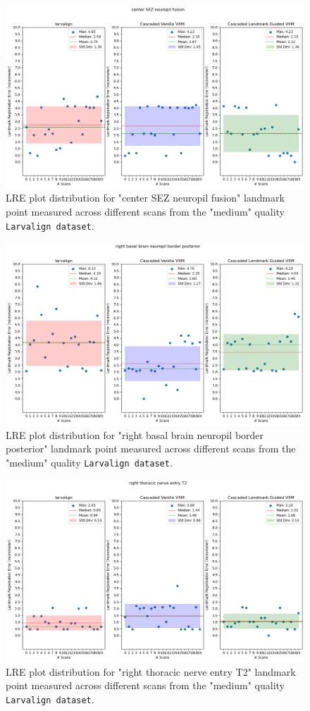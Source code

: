 	\begin{figure}[h]
		\centering
		\includegraphics[width=0.75\columnwidth]{resources/chapter5_fresh/output/center SEZ neuropil fusion.png}
		\caption{LRE plot distribution for "center SEZ neuropil fusion" landmark point measured across different scans from the "medium" quality \texttt{Larvalign dataset}.}
		\label{fig:landmark3}
	\end{figure}

	\begin{figure}[h]
		\centering
		\includegraphics[width=0.75\columnwidth]{resources/chapter5_fresh/output/right basal brain neuropil border posterior.png}
		\caption{LRE plot distribution for "right basal brain neuropil border posterior" landmark point measured across different scans from the "medium" quality \texttt{Larvalign dataset}.}
		\label{fig:landmark4}
	\end{figure}

	\begin{figure}[h]
		\centering
		\includegraphics[width=0.75\columnwidth]{resources/chapter5_fresh/output/right thoracic nerve entry T2.png}
		\caption{LRE plot distribution for "right thoracic nerve entry T2" landmark point measured across different scans from the "medium" quality \texttt{Larvalign dataset}.}
		\label{fig:landmark5}
	\end{figure}

